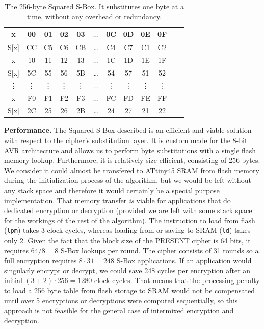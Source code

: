 \documentclass[11pt]{llncs2e} %
\begin{document}
\begin{table}
\footnotesize
\centering
\begin{tabular}{| c | c  | c | c | c  | c  | c | c | c  | c | c | c |}
\hline
  x & 00 & 01 & 02 & 03  &  $\dots$  & 0C & 0D & 0E & 0F   \\
\hline
 S[x] & CC & C5 & C6 & CB & \dots & C4 & C7 & C1 & C2   \\
\hline
  x & 10 & 11 & 12 & 13  &  $\dots$  & 1C & 1D & 1E & 1F   \\
\hline
 S[x] & 5C & 55 & 56 & 5B & \dots & 54 & 57 & 51 & 52   \\
\hline
  \vdots & \vdots & \vdots & \vdots & \vdots  &  $\dots$  & \vdots &\vdots & \vdots & \vdots   \\
\hline
  x & F0 & F1 & F2 & F3  &  $\dots$  & FC & FD & FE & FF   \\
\hline
 S[x] & 2C & 25 & 26 & 2B & \dots & 24 & 27 & 21 & 22   \\


\hline
\end{tabular}
 \caption{\footnotesize The 256-byte Squared S-Box. It substitutes one byte at a time, without any overhead or redundancy.}
 \label{squared_sbox}
\end{table}

\textbf{Performance.} The Squared S-Box described is an efficient and viable solution with respect to the cipher's substitution layer. It is custom made for the 8-bit AVR architecture and allows us to perform byte substitutions with a single flash memory lookup. Furthermore, it is relatively size-efficient, consisting of 256 bytes.
We consider it could almost be transfered to ATtiny45 SRAM from flash memory during the initialization process of the algorithm, but we would be left without any stack space and therefore it would certainly be a special purpose implementation.
That memory transfer \emph{is} viable for applications that do dedicated encryption or decryption (provided we are left with some stack space for the workings of the rest of the algorithm).
The instruction to load from flash (\texttt{lpm}) takes 3 clock cycles, whereas loading from or saving to SRAM (\texttt{ld}) takes only 2.
Given the fact that the block size of the PRESENT cipher is 64 bits, it requires $64/8=8$ S-Box lookups per round.
The cipher consists of 31 rounds so a full encryption requires $8 \cdot 31=248$ S-Box applications.
If an application would singularly encrypt or decrypt, we could save 248 cycles per encryption after an initial $(3+2) \cdot 256 = 1280$ clock cycles.
That means that the processing penalty to load a 256 byte table from flash storage to SRAM would not be compensated until over 5 encryptions or decryptions were computed sequentially, so this approach is not feasible for the general case of intermixed encryption and decryption.
\end{document}
